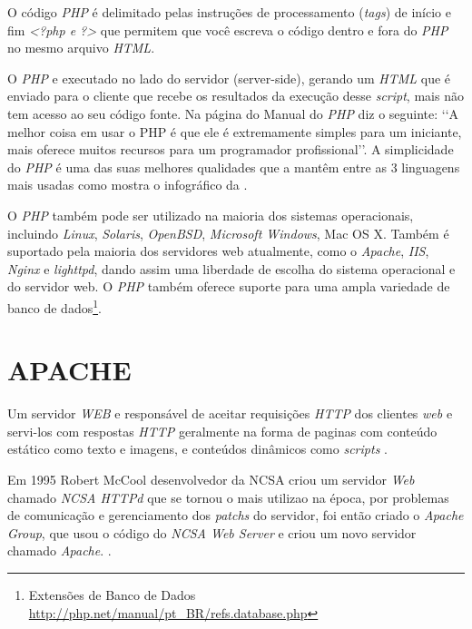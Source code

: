 O código \textit{PHP} é delimitado pelas instruções de processamento (\textit{tags}) de início e fim \textit{<?php e ?>} que permitem que você escreva o código dentro e fora do \textit{PHP} no mesmo arquivo \textit{HTML}. \cite{php-intro}

O \textit{PHP} e executado no lado do servidor (server-side), gerando um \textit{HTML} que é enviado para o cliente que recebe os resultados da execução desse \textit{script}, mais não tem acesso ao seu código fonte. Na página do Manual do \textit{PHP} diz o seguinte: \lq\lq A melhor coisa em usar o PHP é que ele é extremamente simples para um iniciante, mais oferece muitos recursos para um programador profissional\rq\rq {}. A simplicidade do \textit{PHP} é uma das suas melhores qualidades que a mantêm entre as 3 linguagens mais usadas como mostra o infográfico da .

O \textit{PHP} também pode ser utilizado na maioria dos sistemas operacionais, incluindo \textit{Linux}, \textit{Solaris}, \textit{OpenBSD}, \textit{Microsoft Windows}, Mac OS X. Também é suportado pela maioria dos servidores web atualmente, como o \textit{Apache}, \textit{IIS}, \textit{Nginx} e \textit{lighttpd}, dando assim uma liberdade de escolha do sistema operacional e do servidor web. O \textit{PHP} também oferece suporte para uma ampla variedade de banco de dados\footnote{Extensões de Banco de Dados \url{http://php.net/manual/pt_BR/refs.database.php}}.


\section{APACHE}

Um servidor \textit{WEB} e responsável de aceitar requisições \textit{HTTP} dos clientes \textit{web} e servi-los com respostas \textit{HTTP} geralmente na forma de paginas com conteúdo estático como texto e imagens, e conteúdos dinâmicos como \textit{scripts} \cite[p.~15]{igor}.

Em 1995 Robert McCool desenvolvedor da \ac{NCSA} criou um servidor \textit{Web} chamado \textit{NCSA HTTPd} que se tornou o mais utilizao na época, por problemas de comunicação e gerenciamento dos \textit{patchs} do servidor, foi então criado o \textit{Apache Group}, que usou o código do \textit{NCSA Web Server} e criou um novo servidor chamado \textit{Apache}. \cite[p.~36]{kabir}.

